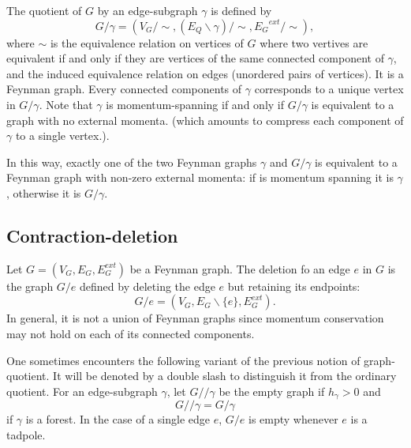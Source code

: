 \documentclass[11pt]{article}
\begin{document}
The quotient of $G$ by an edge-subgraph $\gamma$ is defined by
$$
G/\gamma=(V_G/\sim,(E_Q\backslash \gamma)/\sim, {E_G}^{ext}/\sim),
$$
where $\sim$ is the equivalence relation on vertices of $G$ where two vertives are equivalent if and only if they are vertices of the same connected component of $\gamma$, and the induced equivalence relation on edges (unordered pairs of vertices). It is a Feynman graph. Every connected components of $\gamma$ corresponds to a unique vertex in $G/\gamma$. Note that $\gamma$ is momentum-spanning if and only if $G/\gamma$ is equivalent to a graph with no external momenta. (which amounts to compress each component of $\gamma$ to a single vertex.).

In this way, exactly one of the two Feynman graphs $\gamma$ and $G/\gamma$ is equivalent to a Feynman graph with non-zero external momenta: if  is momentum spanning it is $\gamma$, otherwise it is $G/\gamma$.

\subsection{Contraction-deletion}
Let $G=(V_G,E_G,E^{ext}_G)$ be a Feynman graph. The deletion fo an edge $e$ in $G$ is the graph $G/e$ defined by deleting the edge $e$ but retaining its endpoints:
$$
G/e=(V_G,E_G\backslash\{e\}, E^{ext}_G).
$$
In general, it is not a union of Feynman graphs since momentum conservation may not hold on each of its connected components.

One sometimes encounters the following variant of the previous notion of graph-quotient. It will be denoted by a double slash to distinguish it from the ordinary quotient. For an edge-subgraph $\gamma$, let $G//\gamma$ be the empty graph if $h_\gamma>0$ and
$$
G//\gamma=G/\gamma
$$
if $\gamma$ is a forest. In the case of a single edge $e$, $G/e$ is empty whenever $e$ is a tadpole.
\end{document}
